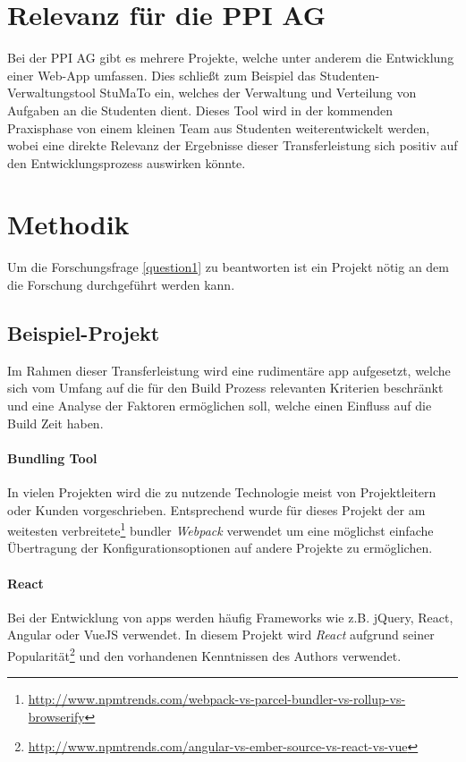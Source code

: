 \documentclass[11pt]{report}
\begin{document}
		\section{Relevanz für die PPI AG}
			Bei der PPI AG gibt es mehrere Projekte, welche unter anderem die Entwicklung einer Web-App umfassen. Dies schließt zum Beispiel das Studenten-Verwaltungstool StuMaTo ein, welches der Verwaltung und Verteilung von Aufgaben an die Studenten dient. Dieses Tool wird in der kommenden Praxisphase von einem kleinen Team aus Studenten weiterentwickelt werden, wobei eine direkte Relevanz der Ergebnisse dieser Transferleistung sich positiv auf den Entwicklungsprozess auswirken könnte.
	

		\section{Methodik}
			Um die Forschungsfrage \ref{question1} zu beantworten ist ein Projekt nötig an dem die Forschung durchgeführt werden kann.
			\subsection{Beispiel-Projekt}
				Im Rahmen dieser Transferleistung wird eine rudimentäre \Gls{app} aufgesetzt, welche sich vom Umfang auf die für den Build Prozess relevanten Kriterien beschränkt und eine Analyse der Faktoren ermöglichen soll, welche einen Einfluss auf die Build Zeit haben.

				\paragraph{Bundling Tool} In vielen Projekten wird die zu nutzende Technologie meist von Projektleitern oder Kunden vorgeschrieben. Entsprechend wurde für dieses Projekt der am weitesten verbreitete\footnote{\url{http://www.npmtrends.com/webpack-vs-parcel-bundler-vs-rollup-vs-browserify}} \Gls{bundler} \emph{Webpack} verwendet um eine möglichst einfache Übertragung der Konfigurationsoptionen auf andere Projekte zu ermöglichen.

				\paragraph{React} Bei der Entwicklung von \Glspl{app} werden häufig Frameworks wie z.B. jQuery, React, Angular oder VueJS verwendet. In diesem Projekt wird \emph{React} aufgrund seiner Popularität\footnote{\url{http://www.npmtrends.com/angular-vs-ember-source-vs-react-vs-vue}} und den vorhandenen Kenntnissen des Authors verwendet.
\end{document}
